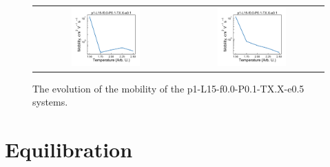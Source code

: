\documentclass[12pt]{article}
\begin{document}
\begin{figure}[h!]\centering
    \begin{tabular}{cc}
        \includegraphics[width=0.5\textwidth]{Figures/origP3HTMob.pdf}&
        \includegraphics[width=0.5\textwidth]{Figures/equilP3HTMob.pdf}
    \end{tabular}
    \caption{The evolution of the mobility of the p1-L15-f0.0-P0.1-TX.X-e0.5 systems.
}
	\label{fig:mob}
\end{figure}

\clearpage

\section{Equilibration}
\end{document}
